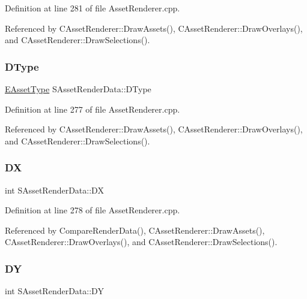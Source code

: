 Definition at line 281 of file Asset\+Renderer.\+cpp.



Referenced by C\+Asset\+Renderer\+::\+Draw\+Assets(), C\+Asset\+Renderer\+::\+Draw\+Overlays(), and C\+Asset\+Renderer\+::\+Draw\+Selections().

\hypertarget{structSAssetRenderData_ae986cfe9d4238fa31fb511b40392d97f}{}\label{structSAssetRenderData_ae986cfe9d4238fa31fb511b40392d97f} 
\subsubsection{\texorpdfstring{D\+Type}{DType}}
{\footnotesize\ttfamily \hyperlink{GameDataTypes_8h_a5600d4fc433b83300308921974477fec}{E\+Asset\+Type} S\+Asset\+Render\+Data\+::\+D\+Type}



Definition at line 277 of file Asset\+Renderer.\+cpp.



Referenced by C\+Asset\+Renderer\+::\+Draw\+Assets(), C\+Asset\+Renderer\+::\+Draw\+Overlays(), and C\+Asset\+Renderer\+::\+Draw\+Selections().

\hypertarget{structSAssetRenderData_ab432edfd1146e38a92576b78e2ad5581}{}\label{structSAssetRenderData_ab432edfd1146e38a92576b78e2ad5581} 
\subsubsection{\texorpdfstring{DX}{DX}}
{\footnotesize\ttfamily int S\+Asset\+Render\+Data\+::\+DX}



Definition at line 278 of file Asset\+Renderer.\+cpp.



Referenced by Compare\+Render\+Data(), C\+Asset\+Renderer\+::\+Draw\+Assets(), C\+Asset\+Renderer\+::\+Draw\+Overlays(), and C\+Asset\+Renderer\+::\+Draw\+Selections().

\hypertarget{structSAssetRenderData_af27e8a46e21a0935983bfc0d34d9ceba}{}\label{structSAssetRenderData_af27e8a46e21a0935983bfc0d34d9ceba} 
\subsubsection{\texorpdfstring{DY}{DY}}
{\footnotesize\ttfamily int S\+Asset\+Render\+Data\+::\+DY}



